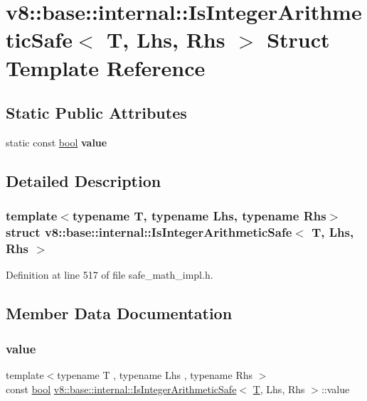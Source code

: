 \hypertarget{structv8_1_1base_1_1internal_1_1IsIntegerArithmeticSafe}{}\section{v8\+:\+:base\+:\+:internal\+:\+:Is\+Integer\+Arithmetic\+Safe$<$ T, Lhs, Rhs $>$ Struct Template Reference}
\label{structv8_1_1base_1_1internal_1_1IsIntegerArithmeticSafe}
\subsection*{Static Public Attributes}
\begin{DoxyCompactItemize}
\item 
static const \mbox{\hyperlink{classbool}{bool}} {\bfseries value}
\end{DoxyCompactItemize}


\subsection{Detailed Description}
\subsubsection*{template$<$typename T, typename Lhs, typename Rhs$>$\newline
struct v8\+::base\+::internal\+::\+Is\+Integer\+Arithmetic\+Safe$<$ T, Lhs, Rhs $>$}



Definition at line 517 of file safe\+\_\+math\+\_\+impl.\+h.



\subsection{Member Data Documentation}
\mbox{\label{structv8_1_1base_1_1internal_1_1IsIntegerArithmeticSafe_a52e992f56789e94edf26f3c7d20eb0eb}} 
\subsubsection{\texorpdfstring{value}{value}}
{\footnotesize\ttfamily template$<$typename T , typename Lhs , typename Rhs $>$ \\
const \mbox{\hyperlink{classbool}{bool}} \mbox{\hyperlink{structv8_1_1base_1_1internal_1_1IsIntegerArithmeticSafe}{v8\+::base\+::internal\+::\+Is\+Integer\+Arithmetic\+Safe}}$<$ \mbox{\hyperlink{classv8_1_1internal_1_1torque_1_1T}{T}}, Lhs, Rhs $>$\+::value\hspace{0.3cm}{\ttfamily [static]}}

